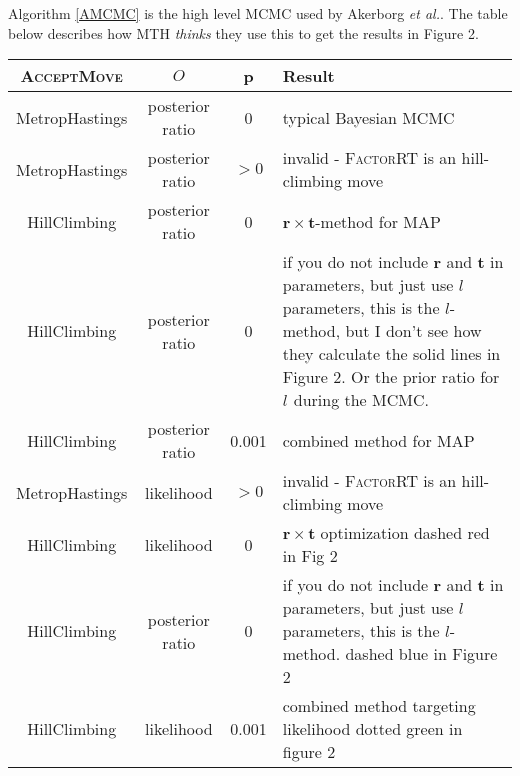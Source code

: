\documentclass{llncs}
\newcommand{\etal}[0]{{\em et al.}\xspace}
\newcommand{\edgeLen}[1]{\ensuremath{l_{#1}}\xspace}
\newcommand{\ratevec}[0]{\ensuremath{\mathbf{r}}\xspace}
\newcommand{\timevec}[0]{\ensuremath{\mathbf{t}}\xspace}
\begin{document}
Algorithm \ref{AMCMC} is the high level MCMC used by Akerborg \etal.
The table below describes how MTH {\em thinks} they use this to 
get the results in Figure 2.
\begin{table}
    \begin{tabular}{c|c|c|p{20em}}
\textsc{AcceptMove} & $O$ & p & Result \\
\hline
MetropHastings & posterior ratio & 0 & typical Bayesian MCMC \\
\hline
MetropHastings & posterior ratio & $>0$ & invalid - \textsc{FactorRT} is an hill-climbing move\\
\hline
HillClimbing & posterior ratio & 0 & $\ratevec\times \timevec$-method for MAP \\
\hline
HillClimbing & posterior ratio & 0  & if you do not include $\ratevec$ and $\timevec$ in parameters, but just use $\edgeLen{}$ parameters, this is the $l$-method, but I don't see how they calculate the solid lines in Figure 2. Or the prior ratio for $\edgeLen{}$ during the MCMC. \\
\hline
HillClimbing & posterior ratio & 0.001 & combined method for MAP \\
\hline
MetropHastings & likelihood & $>0$ & invalid - \textsc{FactorRT} is an hill-climbing move\\
\hline
HillClimbing & likelihood & 0 & $\ratevec\times\timevec$ optimization dashed red in Fig 2 \\
\hline
HillClimbing & posterior ratio & 0  & if you do not include $\ratevec$ and $\timevec$ in parameters, but just use $\edgeLen{}$ parameters, this is the $l$-method. dashed blue in Figure 2 \\
\hline
HillClimbing & likelihood & 0.001 & combined method targeting likelihood dotted green in figure 2 \\
\hline
\end{tabular}
\end{table}
\end{document}
